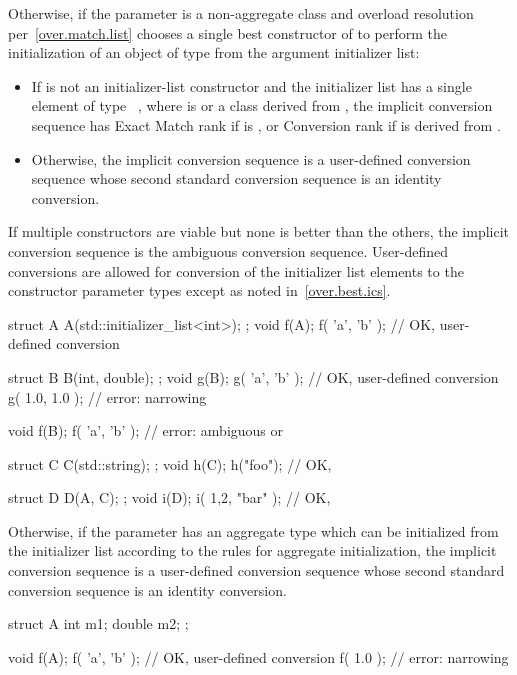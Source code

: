 \pnum
Otherwise, if the parameter is a non-aggregate class  and overload
resolution per~\ref{over.match.list} chooses a single best constructor  of
 to perform the initialization of an object of type  from the
argument initializer list:
\begin{itemize}
\item
If  is not an initializer-list constructor
and the initializer list has a single element of type \cv{}~,
where  is  or a class derived from ,
the implicit conversion sequence has Exact Match rank if  is ,
or Conversion rank if  is derived from .
\item
Otherwise, the implicit conversion sequence is a user-defined
conversion sequence whose second standard conversion sequence is an
identity conversion.
\end{itemize}
If multiple constructors are viable but none is better than
the others, the implicit conversion sequence is the ambiguous conversion
sequence. User-defined conversions are allowed for conversion of the initializer
list elements to the constructor parameter types except as noted
in~\ref{over.best.ics}.
\begin{example}
\begin{codeblock}
struct A {
  A(std::initializer_list<int>);
};
void f(A);
f( {'a', 'b'} );        // OK,  user-defined conversion

struct B {
  B(int, double);
};
void g(B);
g( {'a', 'b'} );        // OK,  user-defined conversion
g( {1.0, 1.0} );        // error: narrowing

void f(B);
f( {'a', 'b'} );        // error: ambiguous  or 

struct C {
  C(std::string);
};
void h(C);
h({"foo"});             // OK, 

struct D {
  D(A, C);
};
void i(D);
i({ {1,2}, {"bar"} });  // OK, 
\end{codeblock}
\end{example}

\pnum
Otherwise, if the parameter has an aggregate type which can be initialized from
the initializer list according to the rules for aggregate
initialization, the implicit conversion sequence is a
user-defined conversion sequence whose second standard conversion
sequence is an identity conversion.
\begin{example}
\begin{codeblock}
struct A {
  int m1;
  double m2;
};

void f(A);
f( {'a', 'b'} );        // OK,  user-defined conversion
f( {1.0} );             // error: narrowing
\end{codeblock}
\end{example}

